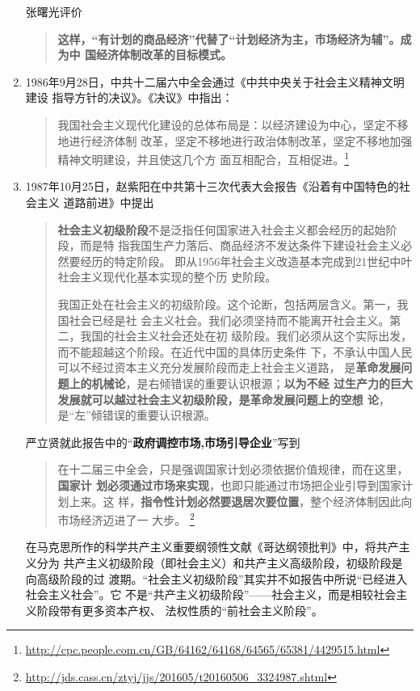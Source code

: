 \begin{enumerate}
  张曙光评价
  \begin{quotation}
    \textbf{这样，“有计划的商品经济”代替了“计划经济为主，市场经济为辅”。成为中
      国经济体制改革的目标模式。}
  \end{quotation}

\item 1986年9月28日，中共十二届六中全会通过《中共中央关于社会主义精神文明建设
  指导方针的决议》。《决议》中指出：
  \begin{quotation}
    我国社会主义现代化建设的总体布局是：以经济建设为中心，坚定不移地进行经济体制
    改革，坚定不移地进行政治体制改革，坚定不移地加强精神文明建设，并且使这几个方
    面互相配合，互相促进。\footnote{\url{http://cpc.people.com.cn/GB/64162/64168/64565/65381/4429515.html}}
  \end{quotation}

\item 1987年10月25日，赵紫阳在中共第十三次代表大会报告《沿着有中国特色的社会主义
  道路前进》中提出
  \begin{quotation}
    \textbf{社会主义初级阶段}不是泛指任何国家进入社会主义都会经历的起始阶段，而是特
    指我国生产力落后、商品经济不发达条件下建设社会主义必然要经历的特定阶段。
    即从1956年社会主义改造基本完成到21世纪中叶社会主义现代化基本实现的整个历
    史阶段。

    我国正处在社会主义的初级阶段。这个论断，包括两层含义。第一，我国社会已经是社
    会主义社会。我们必须坚持而不能离开社会主义。第二，我国的社会主义社会还处在初
    级阶段。我们必须从这个实际出发，而不能超越这个阶段。在近代中国的具体历史条件
    下，不承认中国人民可以不经过资本主义充分发展阶段而走上社会主义道路，
    是\textbf{革命发展问题上的机械论}，是右倾错误的重要认识根源；\textbf{以为不经
      过生产力的巨大发展就可以越过社会主义初级阶段，是革命发展问题上的空想
      论}，是“左”倾错误的重要认识根源。
  \end{quotation}

  严立贤就此报告中的“\textbf{政府调控市场,市场引导企业}”写到
  \begin{quotation}
    在十二届三中全会，只是强调国家计划必须依据价值规律，而在这里，\textbf{国家计
      划必须通过市场来实现}，也即只能通过市场把企业引导到国家计划上来。这
    样，\textbf{指令性计划必然要退居次要位置}，整个经济体制因此向市场经济迈进了一
    大步。 \footnote{\url{http://jds.cass.cn/ztyj/jjs/201605/t20160506_3324987.shtml}} \end{quotation}

  在马克思所作的科学共产主义重要纲领性文献《哥达纲领批判》中，将共产主义分为
  共产主义初级阶段（即社会主义）和共产主义高级阶段，初级阶段是向高级阶段的过
  渡期。“社会主义初级阶段”其实并不如报告中所说“已经进入社会主义社会”。它
  不是“共产主义初级阶段”——社会主义，而是相较社会主义阶段带有更多资本产权、
  法权性质的“前社会主义阶段”。



\end{enumerate}

